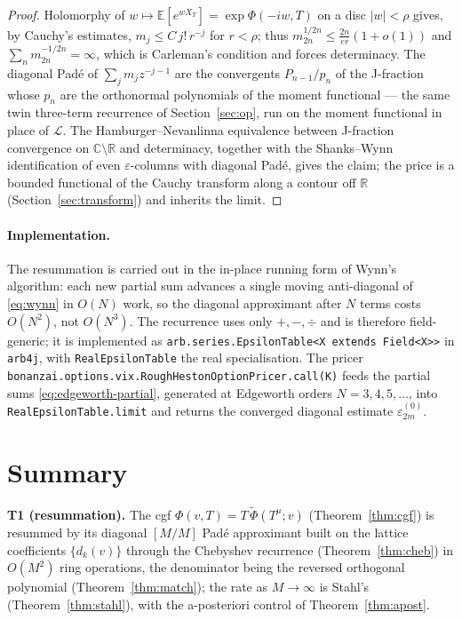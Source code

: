 \documentclass[11pt]{article}
\newcommand{\C}{\mathbb{C}}
\newcommand{\R}{\mathbb{R}}
\newcommand{\E}{\mathbb{E}}
\newcommand{\Lc}{\mathcal{L}}
\begin{document}
\begin{proof}
Holomorphy of $w\mapsto\E[e^{wX_T}]=\exp\Phi(-iw,T)$ on a disc $|w|<\rho$ gives,
by Cauchy's estimates, $m_j\le C\,j!\,r^{-j}$ for $r<\rho$; thus
$m_{2n}^{1/2n}\le\frac{2n}{er}(1+o(1))$ and $\sum_n m_{2n}^{-1/2n}=\infty$, which
is Carleman's condition and forces determinacy. The diagonal Pad\'e of
$\sum_j m_j z^{-j-1}$ are the convergents $P_{n-1}/p_n$ of the J-fraction whose
$p_n$ are the orthonormal polynomials of the moment functional --- the same twin
three-term recurrence of Section~\ref{sec:op}, run on the moment functional in
place of $\Lc$. The Hamburger--Nevanlinna equivalence between J-fraction
convergence on $\C\setminus\R$ and determinacy, together with the Shanks--Wynn
identification of even $\varepsilon$-columns with diagonal Pad\'e, gives the
claim; the price is a bounded functional of the Cauchy transform along a contour
off $\R$ \textup{(Section~\ref{sec:transform})} and inherits the limit.
\end{proof}

\paragraph{Implementation.}
The resummation is carried out in the in-place running form of Wynn's algorithm:
each new partial sum advances a single moving anti-diagonal of \eqref{eq:wynn}
in $O(N)$ work, so the diagonal approximant after $N$ terms costs $O(N^2)$, not
$O(N^3)$. The recurrence uses only $+,-,\div$ and is therefore field-generic; it
is implemented as \verb|arb.series.EpsilonTable<X extends Field<X>>| in
\texttt{arb4j}, with \verb|RealEpsilonTable| the real specialisation. The pricer
\verb|bonanzai.options.vix.RoughHestonOptionPricer.call(K)| feeds the partial
sums \eqref{eq:edgeworth-partial}, generated at Edgeworth orders $N=3,4,5,\dots$,
into \verb|RealEpsilonTable.limit| and returns the converged diagonal estimate
$\varepsilon^{(0)}_{2m}$.

\section{Summary}\label{sec:summary}

\textbf{T1 (resummation).} The cgf $\Phi(v,T)=T\,\widetilde\Phi(T^{\mu};v)$
(Theorem~\ref{thm:cgf}) is resummed by its diagonal $[M/M]$ Pad\'e
approximant built on the lattice coefficients $\{d_k(v)\}$ through the
Chebyshev recurrence (Theorem~\ref{thm:cheb}) in $O(M^2)$ ring operations,
the denominator being the reversed orthogonal polynomial
(Theorem~\ref{thm:match}); the rate as $M\to\infty$ is Stahl's
(Theorem~\ref{thm:stahl}), with the a-posteriori control of
Theorem~\ref{thm:apost}.
\end{document}
